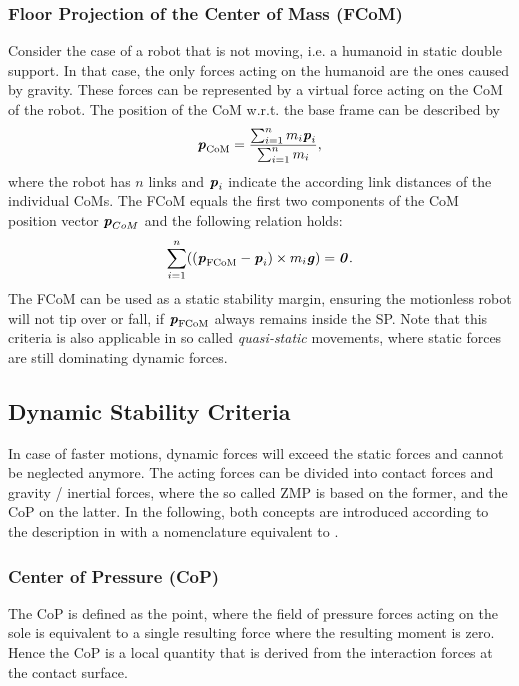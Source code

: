 \subsubsection{Floor Projection of the Center of Mass (FCoM)}
Consider the case of a robot that is not moving, i.e. a humanoid in static double support. In that case, the only forces acting on the humanoid are the ones caused by gravity. These forces can be represented by a virtual force acting on the \gls{CoM} of the robot. The position of the \gls{CoM} w.r.t. the base frame can be described by
\begin{equation*} 
\bm{\mathit{p}}_{\text{CoM}}=\dfrac{\sum_{i=1}^{n}m_i\bm{\mathit{p}}_i}{\sum_{i=1}^{n}m_i},
\end{equation*}
where the robot has $n$ links and $\bm{\mathit{p}}_i$ indicate the according link distances of the individual \gls{CoM}s. The \gls{FCoM} equals the first two components of the \gls{CoM} position vector $\bm{\mathit{p}}_{CoM}$ and the following relation holds:
\begin{equation*} 
\sum_{i=1}^{n}((\bm{\mathit{p}}_{\text{FCoM}}-\bm{\mathit{p}}_i)\times m_i\bm{\mathit{g}})=\bm{\mathit{0}}.
\end{equation*}
The \gls{FCoM} can be used as a static stability margin, ensuring the motionless robot will not tip over or fall, if $\bm{\mathit{p}}_{\text{FCoM}}$ always remains inside the \gls{SP}. Note that this criteria is also applicable in so called \textit{quasi-static} movements, where static forces are still dominating dynamic forces.

\subsection{Dynamic Stability Criteria}
In case of faster motions, dynamic forces will exceed the static forces and cannot be neglected anymore. The acting forces can be divided into contact forces and gravity / inertial forces, where the so called \gls{ZMP} is based on the former, and the \gls{CoP} on the latter. In the following, both concepts are introduced according to the description in \cite{sardain2004forces} with a nomenclature equivalent to \cite{scaronTeaching}.
\subsubsection{Center of Pressure (CoP)}
The \gls{CoP} is defined as the point, where the field of pressure forces acting on the sole is equivalent to a single resulting force where the resulting moment is zero. Hence the \gls{CoP} is a local quantity that is derived from the interaction forces at the contact surface. 

